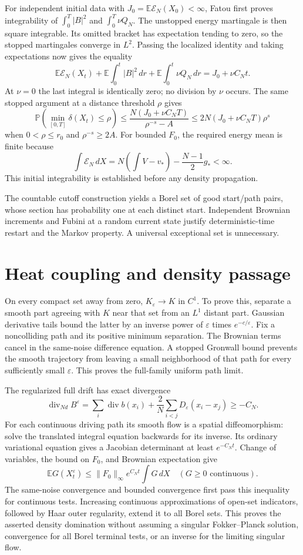 \documentclass[10pt]{article}
\newcommand{\E}{\mathbb E}
\newcommand{\Pp}{\mathbb P}
\begin{document}
For independent initial data with $J_0=\E\mathcal E_N(X_0)<\infty$, Fatou
first proves integrability of $\int_0^T|B|^2$ and $\int_0^T\nu Q_N$.
The unstopped energy martingale is then square integrable. Its omitted bracket
has expectation tending to zero, so the stopped martingales converge in $L^2$.
Passing the localized identity and taking expectations now gives the equality
\[
 \E\mathcal E_N(X_t)+\E\int_0^t|B|^2\,dr
        +\E\int_0^t\nu Q_N\,dr=J_0+\nu C_Nt.
\]
At $\nu=0$ the last integral is identically zero; no division by $\nu$ occurs.
The same stopped argument at a distance threshold $\rho$ gives
\[
 \Pp\left(\min_{[0,T]}\delta(X_t)\le\rho\right)
 \le\frac{N(J_0+\nu C_NT)}{\rho^{-s}-A}
 \le2N(J_0+\nu C_NT)\rho^s
\]
when $0<\rho\le r_0$ and $\rho^{-s}\ge2A$.
For bounded $F_0$, the required energy mean is finite because
\[
 \int\mathcal E_N\,dX=N\left(\int V-v_*\right)-\frac{N-1}{2}g_*<\infty.
\]
This initial integrability is established before any density propagation.

The countable cutoff construction yields a Borel set of good start/path pairs,
whose section has probability one at each distinct start. Independent Brownian
increments and Fubini at a random current state justify deterministic-time
restart and the Markov property. A universal exceptional set is unnecessary.

\section*{Heat coupling and density passage}
On every compact set away from zero, $K_\varepsilon\to K$ in $C^1$.
To prove this, separate a smooth part agreeing with $K$ near that set from an
$L^1$ distant part. Gaussian derivative tails bound the latter by an inverse
power of $\varepsilon$ times $e^{-c/\varepsilon}$. Fix a noncolliding path and
its positive minimum separation. The Brownian terms cancel in the same-noise
difference equation. A stopped Gronwall bound prevents the smooth trajectory
from leaving a small neighborhood of that path for every sufficiently small
$\varepsilon$. This proves the full-family uniform path limit.

The regularized full drift has exact divergence
\[
 \operatorname{div}_{Nd}B^\varepsilon
 =\sum_i\operatorname{div}b(x_i)+\frac2N\sum_{i<j}D_\varepsilon(x_i-x_j)
 \ge-C_N.
\]
For each continuous driving path its smooth flow is a spatial diffeomorphism:
solve the translated integral equation backwards for its inverse. Its ordinary
variational equation gives a Jacobian determinant at least $e^{-C_Nt}$.
Change of variables, the bound on $F_0$, and Brownian expectation give
\[
 \E G(X_t^\varepsilon)\le\|F_0\|_\infty e^{C_Nt}\int G\,dX
 \quad(G\ge0\text{ continuous}).
\]
The same-noise convergence and bounded convergence first pass this inequality
for continuous tests. Increasing continuous approximations of open-set
indicators, followed by Haar outer regularity, extend it to all Borel sets.
This proves the asserted density domination without assuming a singular
Fokker--Planck solution, convergence for all Borel terminal tests, or an inverse
for the limiting singular flow.
\end{document}
